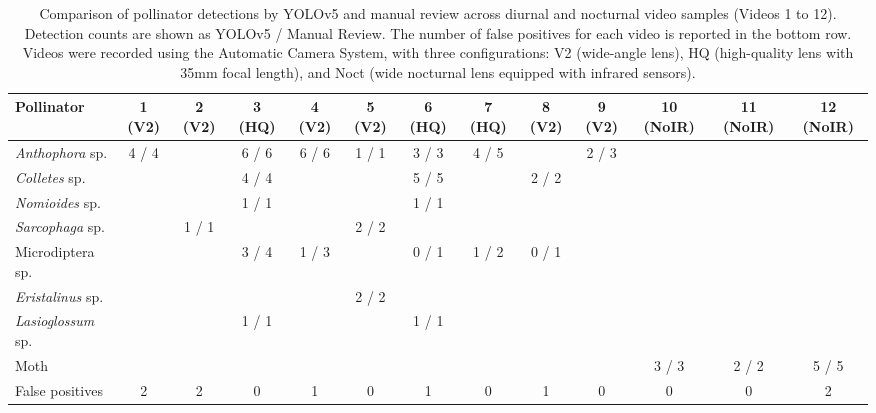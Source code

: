 \documentclass[]{article}
\renewcommand{\(}{\left(}
\renewcommand{\)}{\right)}
\renewcommand{\[}{\left[}
\renewcommand{\]}{\right]}
\begin{document}
\begin{table}[h!]
\centering
\caption{Comparison of pollinator detections by YOLOv5 and manual review across diurnal and nocturnal video samples (Videos 1 to 12). Detection counts are shown as YOLOv5 / Manual Review. The number of false positives for each video is reported in the bottom row. Videos were recorded using the Automatic Camera System, with three configurations: V2 (wide-angle lens), HQ (high-quality lens with 35mm focal length), and Noct (wide nocturnal lens equipped with infrared sensors).}
\label{manual_video_review}
\begin{adjustbox}{max width=\textwidth}
\begin{tabular}{lcccccccccccc}
\toprule
\textbf{Pollinator} & \textbf{1 (V2)} & \textbf{2 (V2)} & \textbf{3 (HQ)} & \textbf{4 (V2)} & \textbf{5 (V2)} & \textbf{6 (HQ)} & \textbf{7 (HQ)} & \textbf{8 (V2)} & \textbf{9 (V2)} & \textbf{10 (NoIR)} & \textbf{11 (NoIR)} & \textbf{12 (NoIR)} \\
\midrule
\textit{Anthophora} sp.      & 4 / 4 &        & 6 / 6 & 6 / 6 & 1 / 1 & 3 / 3 & 4 / 5 &        & 2 / 3 &        &        &        \\
\textit{Colletes} sp.        &       &        & 4 / 4 &       &       & 5 / 5 &       & 2 / 2 &       &        &        &        \\
\textit{Nomioides} sp.       &       &        & 1 / 1 &       &       & 1 / 1 &       &       &       &        &        &        \\
\textit{Sarcophaga} sp.                     &       & 1 / 1  &       &       & 2 / 2 &       &       &       &       &        &        &        \\
Microdiptera sp.                &       &        & 3 / 4 & 1 / 3 &       & 0 / 1 & 1 / 2 & 0 / 1 &       &        &        &        \\
\textit{Eristalinus} sp.    &       &        &       &       & 2 / 2 &       &       &       &       &        &        &        \\
\textit{Lasioglossum} sp.   &       &        & 1 / 1 &       &       & 1 / 1 &       &       &       &        &        &        \\
Moth                        &       &        &       &       &       &       &       &       &       & 3 / 3  & 2 / 2  & 5 / 5  \\
\midrule
False positives             & 2     & 2      & 0     & 1     & 0     & 1     & 0     & 1     & 0     & 0      & 0      & 2      \\
\bottomrule
\end{tabular}
\end{adjustbox}
\end{table}
\end{document}
